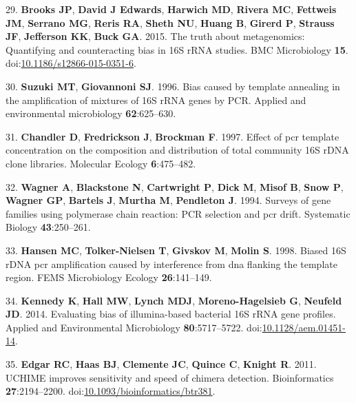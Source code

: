 \documentclass[11pt,]{article}
\begin{document}
\leavevmode\hypertarget{ref-Brooks2015}{}%
29. \textbf{Brooks JP}, \textbf{David J Edwards}, \textbf{Harwich MD},
\textbf{Rivera MC}, \textbf{Fettweis JM}, \textbf{Serrano MG},
\textbf{Reris RA}, \textbf{Sheth NU}, \textbf{Huang B}, \textbf{Girerd
P}, \textbf{Strauss JF}, \textbf{Jefferson KK}, \textbf{Buck GA}. 2015.
The truth about metagenomics: Quantifying and counteracting bias in 16S
rRNA studies. BMC Microbiology \textbf{15}.
doi:\href{https://doi.org/10.1186/s12866-015-0351-6}{10.1186/s12866-015-0351-6}.

\leavevmode\hypertarget{ref-Suzuki1996}{}%
30. \textbf{Suzuki MT}, \textbf{Giovannoni SJ}. 1996. Bias caused by
template annealing in the amplification of mixtures of 16S rRNA genes by
PCR. Applied and environmental microbiology \textbf{62}:625--630.

\leavevmode\hypertarget{ref-Chandler1997}{}%
31. \textbf{Chandler D}, \textbf{Fredrickson J}, \textbf{Brockman F}.
1997. Effect of pcr template concentration on the composition and
distribution of total community 16S rDNA clone libraries. Molecular
Ecology \textbf{6}:475--482.

\leavevmode\hypertarget{ref-Wagner1994}{}%
32. \textbf{Wagner A}, \textbf{Blackstone N}, \textbf{Cartwright P},
\textbf{Dick M}, \textbf{Misof B}, \textbf{Snow P}, \textbf{Wagner GP},
\textbf{Bartels J}, \textbf{Murtha M}, \textbf{Pendleton J}. 1994.
Surveys of gene families using polymerase chain reaction: PCR selection
and pcr drift. Systematic Biology \textbf{43}:250--261.

\leavevmode\hypertarget{ref-Hansen1998}{}%
33. \textbf{Hansen MC}, \textbf{Tolker-Nielsen T}, \textbf{Givskov M},
\textbf{Molin S}. 1998. Biased 16S rDNA pcr amplification caused by
interference from dna flanking the template region. FEMS Microbiology
Ecology \textbf{26}:141--149.

\leavevmode\hypertarget{ref-Kennedy2014}{}%
34. \textbf{Kennedy K}, \textbf{Hall MW}, \textbf{Lynch MDJ},
\textbf{Moreno-Hagelsieb G}, \textbf{Neufeld JD}. 2014. Evaluating bias
of illumina-based bacterial 16S rRNA gene profiles. Applied and
Environmental Microbiology \textbf{80}:5717--5722.
doi:\href{https://doi.org/10.1128/aem.01451-14}{10.1128/aem.01451-14}.

\leavevmode\hypertarget{ref-Edgar2011}{}%
35. \textbf{Edgar RC}, \textbf{Haas BJ}, \textbf{Clemente JC},
\textbf{Quince C}, \textbf{Knight R}. 2011. UCHIME improves sensitivity
and speed of chimera detection. Bioinformatics \textbf{27}:2194--2200.
doi:\href{https://doi.org/10.1093/bioinformatics/btr381}{10.1093/bioinformatics/btr381}.
\end{document}

